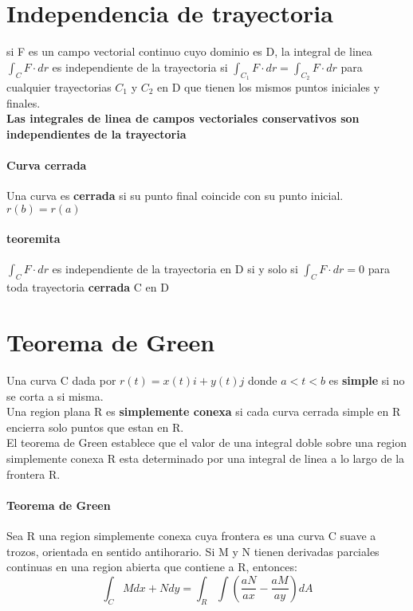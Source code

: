 \documentclass[11pt]{article}
\begin{document}
\section{Independencia de trayectoria}
si F es un campo vectorial continuo cuyo dominio es D, la integral de linea $\int_C F \cdot dr$ es independiente de la trayectoria si $\int_{C_1} F \cdot dr = \int_{C_2} F \cdot dr$ para cualquier trayectorias $C_1$ y $C_2$ en D que tienen los mismos puntos iniciales y finales.\\
\linebreak
\textbf{Las integrales de linea de campos vectoriales conservativos son independientes de la trayectoria}
\paragraph{Curva cerrada}Una curva es \textbf{cerrada} si su punto final coincide con su punto inicial. $r(b) = r(a)$

\paragraph{teoremita} $\int_C F \cdot dr$ es independiente de la trayectoria en D si y solo si $\int_C F \cdot dr = 0$ para toda trayectoria \textbf{cerrada} C en D
\section{Teorema de Green}
Una curva C dada por $r(t) = x(t)i + y(t)j$ donde $a<t<b$ es \textbf{simple} si no se corta a si misma.\\
\linebreak
Una region plana R es \textbf{simplemente conexa} si cada curva cerrada simple en R encierra solo puntos que estan en R.\\
\linebreak
El teorema de Green establece que el valor de una integral doble sobre una region simplemente conexa R esta determinado por una integral de linea a lo largo de la frontera R.
\paragraph{Teorema de Green} Sea R una region simplemente conexa cuya frontera es una curva C suave a trozos, orientada	en sentido antihorario. Si M y N tienen derivadas parciales continuas en una region abierta que contiene a R, entonces:
\begin{equation*}
	\int_C M dx + N dy = \int_R\int \left(\dfrac{aN}{ax} - \dfrac{aM}{ay} \right) dA
\end{equation*}
\end{document}
